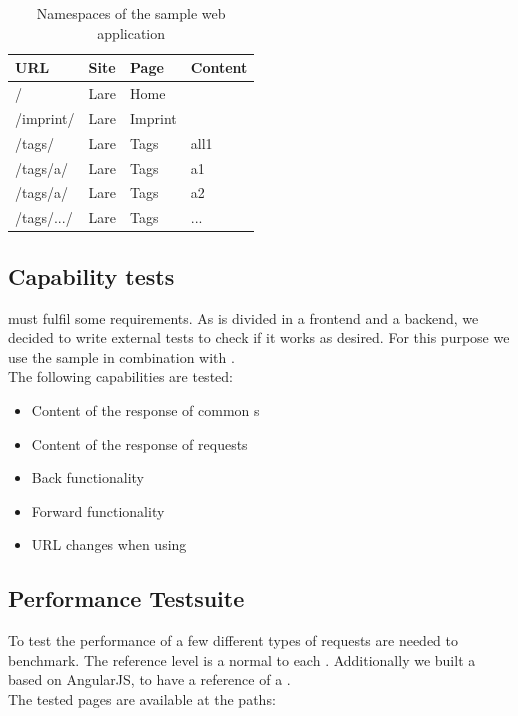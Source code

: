 \begin{table}[h]
\centering
\begin{tabular}{llll}
	\hline
	\textbf{URL} & \textbf{Site} & \textbf{Page} & \textbf{Content} \\
	\hline
	/ & Lare & Home &  \\
	/imprint/ & Lare & Imprint &  \\
	/tags/ & Lare & Tags & all1 \\
	/tags/a/ & Lare & Tags & a1 \\
	/tags/a/ & Lare & Tags & a2 \\
	/tags/.../ & Lare & Tags & ... \\
	\hline
\end{tabular}
\caption{Namespaces of the sample web application}
\label{tab:sampleapp_namespaces}
\end{table}


\subsection{Capability tests\label{browser_functionality_tests}}

\lare{} must fulfil some requirements.
As \lare{} is divided in a frontend and a backend, we decided to write external tests to check if it works as desired.
For this purpose we use the sample \webApplication{} in combination with \selenium{}.
\\
The following capabilities are tested:
\begin{itemize}
\item Content of the response of common \httpRequest{}s
\item Content of the response of \lare{} requests
\item Back functionality
\item Forward functionality
\item URL changes when using \lare{}
\end{itemize}


\subsection{Performance Testsuite\label{testsuite}}

To test the performance of \lare{} a few different types of requests are needed to benchmark.
The reference level is a normal \httpRequest{} to each \webPage{}.
Additionally we built a \webApplication{} based on AngularJS, to have a reference of a \clientSideMVC{}.
\\
The tested pages are available at the paths:


